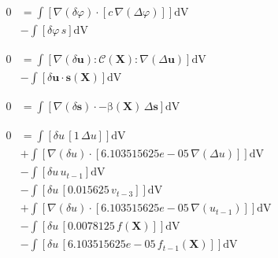 \documentclass[preview,varwidth,multi,border=1pt]{standalone}
\begin{document}
\preview
$\begin{aligned}
0 &= \int\left[\nabla\left(\delta{\varphi}\right) \cdot \left[{c}\,\nabla\left(\Delta{\varphi}\right)\right]\right]\textrm{dV} \\
 &- \int\left[\delta{\varphi}\,{s}\right]\textrm{dV}
\end{aligned}$
\endpreview

\newpage

\preview
$\begin{aligned}
0 &= \int\left[\nabla\left(\delta{\mathbf{u}}\right) \colon \mathcal{\mathcal{C}\left(\mathbf{X}\right)} \colon \nabla\left(\Delta{\mathbf{u}}\right)\right]\textrm{dV}  \\
  &- \int\left[\delta{\mathbf{u}} \cdot \mathrm{\mathbf{s}\left(\mathbf{X}\right)}\right]\textrm{dV}
\end{aligned}$
\endpreview

\newpage

\preview
$\begin{aligned}
0 &= \int\left[\nabla\left(\delta{\mathbf{s}}\right) \cdot -\mathrm{\beta\left(\mathbf{X}\right)}\,\Delta{\mathbf{s}}\right]\textrm{dV}
\end{aligned}$
\endpreview

\newpage

\preview
$\begin{aligned}
0 &= \int\left[\delta{u}\,\left[{1}\,\Delta{u}\right]\right]\textrm{dV} \\
  &+ \int\left[\nabla\left(\delta{u}\right) \cdot \left[{6.103515625e-05}\,\nabla\left(\Delta{u}\right)\right]\right]\textrm{dV} \\
  &- \int\left[\delta{u}\,{u}_{t-1}\right]\textrm{dV} \\
  &- \int\left[\delta{u}\,\left[{0.015625}\,{v}_{t-3}\right]\right]\textrm{dV} \\
  &+ \int\left[\nabla\left(\delta{u}\right) \cdot \left[{6.103515625e-05}\,\nabla\left({u}_{t-1}\right)\right]\right]\textrm{dV} \\
  &- \int\left[\delta{u}\,\left[{0.0078125}\,{f\left(\mathbf{X}\right)}\right]\right]\textrm{dV} \\
  &- \int\left[\delta{u}\,\left[{6.103515625e-05}\,{f_{t-1}\left(\mathbf{X}\right)}\right]\right]\textrm{dV}
\end{aligned}$
\endpreview

\newpage
\end{document}
